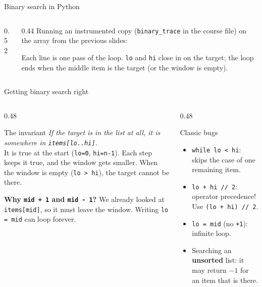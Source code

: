 \documentclass[aspectratio=169,10pt]{beamer}
\begin{document}
\begin{frame}{Binary search in Python}
\begin{columns}[T]
\begin{column}{0.52\textwidth}
\vspace{2mm}
\end{column}
\begin{column}{0.44\textwidth}
{\small Running an instrumented copy (\texttt{binary\_trace} in the course file) on the array from the previous slides:}
\vspace{1mm}
\vspace{2mm}

{\small Each line is one pass of the loop. \texttt{lo} and \texttt{hi} close in on the target; the loop ends when the middle item is the target (or the window is empty).}
\end{column}
\end{columns}
\end{frame}

\begin{frame}{Getting binary search right}
\begin{columns}[T]
\begin{column}{0.48\textwidth}
\begin{block}{The invariant}
{\small \emph{If the target is in the list at all, it is somewhere in \texttt{items[lo..hi]}.}\\[3pt]
It is true at the start (\texttt{lo=0}, \texttt{hi=n-1}). Each step keeps it true, and the window gets smaller. When the window is empty (\texttt{lo > hi}), the target cannot be there.}
\end{block}
{\small\vspace{2mm}
\textbf{Why \texttt{mid + 1} and \texttt{mid - 1}?} We already looked at \texttt{items[mid]}, so it must leave the window. Writing \texttt{lo = mid} can loop forever.}
\end{column}
\begin{column}{0.48\textwidth}
\begin{alertblock}{Classic bugs}
{\small
\begin{itemize}\setlength\itemsep{2pt}
\item \texttt{while lo < hi}: skips the case of one remaining item.
\item \texttt{lo + hi // 2}: operator precedence! Use \texttt{(lo + hi) // 2}.
\item \texttt{lo = mid} (no \texttt{+1}): infinite loop.
\item Searching an \textbf{unsorted} list: it may return $-1$ for an item that is there.
\end{itemize}}
\end{alertblock}
\end{column}
\end{columns}
\end{frame}
\end{document}
